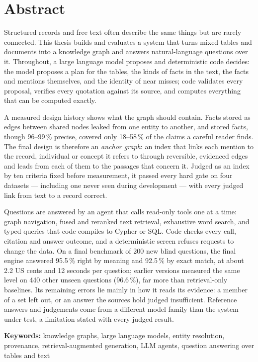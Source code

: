 \chapter*{Abstract}

Structured records and free text often describe the same things but are rarely connected. This thesis builds and
evaluates a system that turns mixed tables and documents into a knowledge graph and answers natural-language questions
over it. Throughout, a large language model proposes and deterministic code decides: the model proposes a plan for the
tables, the kinds of facts in the text, the facts and mentions themselves, and the identity of near misses; code
validates every proposal, verifies every quotation against its source, and computes everything that can be computed
exactly.

A measured design history shows what the graph should contain. Facts stored as edges between shared nodes leaked
from one entity to another, and stored facts, though 96--99\,\% precise, covered only 18--58\,\% of the claims a careful
reader finds. The final design is therefore an \emph{anchor graph}: an index that links each mention to the record,
individual or concept it refers to through reversible, evidenced edges and leads from each of them to the passages
that concern it. Judged as an index by ten criteria fixed before measurement, it passed every hard gate on four
datasets --- including one never seen during development --- with every judged link from text to a record correct.

Questions are answered by an agent that calls read-only tools one at a time: graph navigation, fused and reranked text
retrieval, exhaustive word search, and typed queries that code compiles to Cypher or SQL. Code checks every call,
citation and answer outcome, and a deterministic screen refuses requests to change the data. On a final benchmark of
200 new blind questions, the final engine answered 95.5\,\% right by meaning and 92.5\,\% by exact match, at about 2.2
US cents and 12 seconds per question; earlier versions measured the same level on 440 other unseen questions
(96.6\,\%), far more than retrieval-only baselines. Its remaining errors lie mainly in how it reads its evidence: a
member of a set left out, or an answer the sources hold judged insufficient. Reference answers and judgements come from a different model family than the system under test, a
limitation stated with every judged result.

\vspace{1em}
\noindent\textbf{Keywords:} knowledge graphs, large language models, entity resolution, provenance,
retrieval-augmented generation, LLM agents, question answering over tables and text
